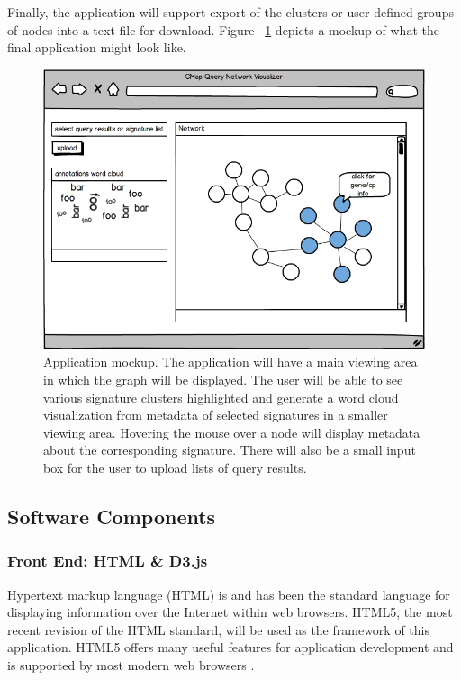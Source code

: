 \documentclass[12pt]{article}
\begin{document}
Finally, the application will support export of the clusters or user-defined groups of nodes into a text file for download. Figure ~\ref{fig:app_mockup} depicts a mockup of what the final application might look like.

\begin{figure}[h]
\centering
\includegraphics[scale=0.5]{img/app_mockup.png}
\caption{Application mockup. The application will have a main viewing area in which the graph will be displayed. The user will be able to see various signature clusters highlighted and generate a word cloud visualization from metadata of selected signatures in a smaller viewing area. Hovering the mouse over a node will display metadata about the corresponding signature. There will also be a small input box for the user to upload lists of query results.}
\label{fig:app_mockup}
\end{figure}


\subsection{Software Components}
\subsubsection{Front End: HTML \& D3.js}

Hypertext markup language (HTML) is and has been the standard language for displaying information over the Internet within web browsers. HTML5, the most recent revision of the HTML standard, will be used as the framework of this application. HTML5 offers many useful features for application development and is supported by most modern web browsers \cite{w3c_html5}. 
\end{document}
